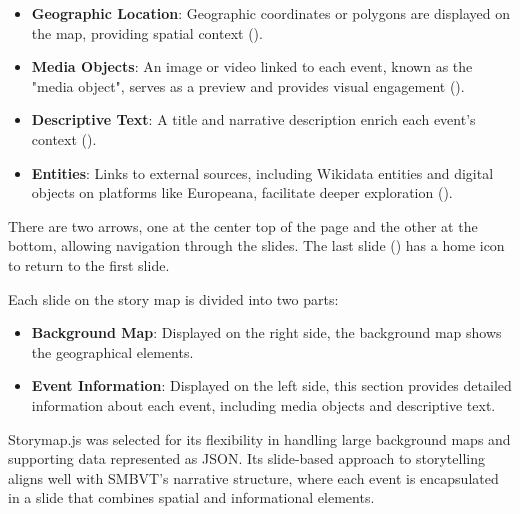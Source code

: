 \begin{itemize}
    \item \textbf{Geographic Location}: Geographic coordinates or polygons are displayed on the map, providing spatial context ().
    \item \textbf{Media Objects}: An image or video linked to each event, known as the "media object", serves as a preview and provides visual engagement ().
    \item \textbf{Descriptive Text}: A title and narrative description enrich each event’s context ().
    \item \textbf{Entities}: Links to external sources, including Wikidata entities and digital objects on platforms like Europeana, facilitate deeper exploration ().
\end{itemize}

There are two arrows, one at the center top of the page and the other at the bottom, allowing navigation through the slides. The last slide () has a home icon to return to the first slide.

Each slide on the story map is divided into two parts:
\begin{itemize}
    \item \textbf{Background Map}: Displayed on the right side, the background map shows the geographical elements.
    \item \textbf{Event Information}: Displayed on the left side, this section provides detailed information about each event, including media objects and descriptive text.
\end{itemize}

Storymap.js was selected for its flexibility in handling large background maps and supporting data represented as JSON. Its slide-based approach to storytelling aligns well with SMBVT’s narrative structure, where each event is encapsulated in a slide that combines spatial and informational elements.

